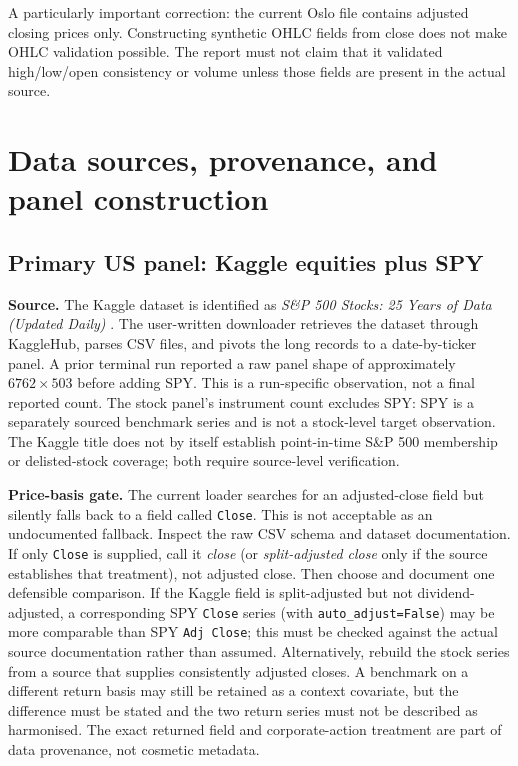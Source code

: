 \documentclass[11pt,a4paper]{article}
\begin{document}
\begin{warningbox}
A particularly important correction: the current Oslo file contains adjusted closing prices only. Constructing synthetic OHLC fields from close does not make OHLC validation possible. The report must not claim that it validated high/low/open consistency or volume unless those fields are present in the actual source.
\end{warningbox}

\section{Data sources, provenance, and panel construction}
\label{sec:data}

\subsection{Primary US panel: Kaggle equities plus SPY}
\label{sec:usdata}

\textbf{Source.} The Kaggle dataset is identified as \emph{S\&P 500 Stocks: 25 Years of Data (Updated Daily)} \cite{KaggleSP500}. The user-written downloader retrieves the dataset through KaggleHub, parses CSV files, and pivots the long records to a date-by-ticker panel. A prior terminal run reported a raw panel shape of approximately $6762\times503$ before adding SPY. This is a run-specific observation, not a final reported count. The stock panel's instrument count excludes SPY: SPY is a separately sourced benchmark series and is not a stock-level target observation. The Kaggle title does not by itself establish point-in-time S\&P 500 membership or delisted-stock coverage; both require source-level verification.

\textbf{Price-basis gate.} The current loader searches for an adjusted-close field but silently falls back to a field called \texttt{Close}. This is not acceptable as an undocumented fallback. Inspect the raw CSV schema and dataset documentation. If only \texttt{Close} is supplied, call it \emph{close} (or \emph{split-adjusted close} only if the source establishes that treatment), not adjusted close. Then choose and document one defensible comparison. If the Kaggle field is split-adjusted but not dividend-adjusted, a corresponding SPY \texttt{Close} series (with \texttt{auto\_adjust=False}) may be more comparable than SPY \texttt{Adj Close}; this must be checked against the actual source documentation rather than assumed. Alternatively, rebuild the stock series from a source that supplies consistently adjusted closes. A benchmark on a different return basis may still be retained as a context covariate, but the difference must be stated and the two return series must not be described as harmonised. The exact returned field and corporate-action treatment are part of data provenance, not cosmetic metadata.
\end{document}
